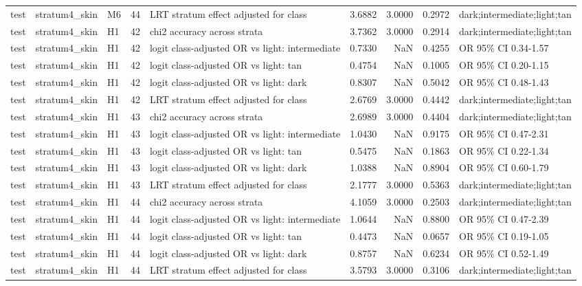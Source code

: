 \begin{tabular}{lllrlrrrl}
test & stratum4\_skin & M6 & 44 & LRT stratum effect adjusted for class & 3.6882 & 3.0000 & 0.2972 & dark;intermediate;light;tan \\
test & stratum4\_skin & H1 & 42 & chi2 accuracy across strata & 3.7362 & 3.0000 & 0.2914 & dark;intermediate;light;tan \\
test & stratum4\_skin & H1 & 42 & logit class-adjusted OR vs light: intermediate & 0.7330 & NaN & 0.4255 & OR 95\% CI 0.34-1.57 \\
test & stratum4\_skin & H1 & 42 & logit class-adjusted OR vs light: tan & 0.4754 & NaN & 0.1005 & OR 95\% CI 0.20-1.15 \\
test & stratum4\_skin & H1 & 42 & logit class-adjusted OR vs light: dark & 0.8307 & NaN & 0.5042 & OR 95\% CI 0.48-1.43 \\
test & stratum4\_skin & H1 & 42 & LRT stratum effect adjusted for class & 2.6769 & 3.0000 & 0.4442 & dark;intermediate;light;tan \\
test & stratum4\_skin & H1 & 43 & chi2 accuracy across strata & 2.6989 & 3.0000 & 0.4404 & dark;intermediate;light;tan \\
test & stratum4\_skin & H1 & 43 & logit class-adjusted OR vs light: intermediate & 1.0430 & NaN & 0.9175 & OR 95\% CI 0.47-2.31 \\
test & stratum4\_skin & H1 & 43 & logit class-adjusted OR vs light: tan & 0.5475 & NaN & 0.1863 & OR 95\% CI 0.22-1.34 \\
test & stratum4\_skin & H1 & 43 & logit class-adjusted OR vs light: dark & 1.0388 & NaN & 0.8904 & OR 95\% CI 0.60-1.79 \\
test & stratum4\_skin & H1 & 43 & LRT stratum effect adjusted for class & 2.1777 & 3.0000 & 0.5363 & dark;intermediate;light;tan \\
test & stratum4\_skin & H1 & 44 & chi2 accuracy across strata & 4.1059 & 3.0000 & 0.2503 & dark;intermediate;light;tan \\
test & stratum4\_skin & H1 & 44 & logit class-adjusted OR vs light: intermediate & 1.0644 & NaN & 0.8800 & OR 95\% CI 0.47-2.39 \\
test & stratum4\_skin & H1 & 44 & logit class-adjusted OR vs light: tan & 0.4473 & NaN & 0.0657 & OR 95\% CI 0.19-1.05 \\
test & stratum4\_skin & H1 & 44 & logit class-adjusted OR vs light: dark & 0.8757 & NaN & 0.6234 & OR 95\% CI 0.52-1.49 \\
test & stratum4\_skin & H1 & 44 & LRT stratum effect adjusted for class & 3.5793 & 3.0000 & 0.3106 & dark;intermediate;light;tan \\

\end{tabular}

